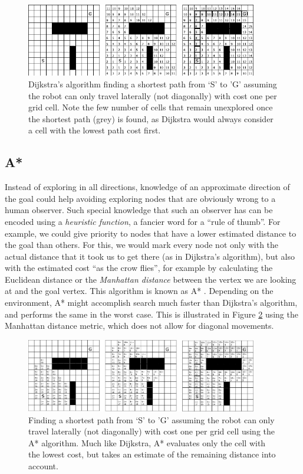 \begin{figure}[htb]
\centering
\includegraphics[width=0.9\textwidth]{figs/dijkstragrid}
\caption{Dijkstra's algorithm finding a shortest path from `S' to 'G' assuming the robot can only travel laterally (not diagonally) with cost one per grid cell. Note the few number of cells that remain unexplored once the shortest path (grey) is found, as Dijkstra would always consider a cell with the lowest path cost first.\label{fig:dijkstragrid}}
\end{figure}

\subsection{A*}\label{sec:astar}
Instead of exploring in all directions, knowledge of an approximate direction of the goal could help avoiding exploring nodes that are obviously wrong to a human observer. Such special knowledge that such an observer has can be encoded using a \emph{heuristic function}, a fancier word for a ``rule of thumb''. For example, we could give priority to nodes that have a lower estimated distance to the goal than others. For this, we would mark every node not only with the actual distance that it took us to get there (as in Dijkstra's algorithm), but also with the estimated cost ``as the crow flies'', for example by calculating the Euclidean distance or the \emph{Manhattan distance} between the vertex we are looking at and the goal vertex. This algorithm is known as A* \cite{hart1968formal}. Depending on the environment, A* might accomplish search much faster than Dijkstra's algorithm, and performs the same in the worst case. This is illustrated in Figure \ref{fig:astargrid} using the Manhattan distance metric, which does not allow for diagonal movements.

\begin{figure}[htb]
\centering
\includegraphics[width=0.9\textwidth]{figs/astargrid}
\caption{Finding a shortest path from `S' to 'G' assuming the robot can only travel laterally (not diagonally) with cost one per grid cell using the A* algorithm. Much like Dijkstra, A* evaluates only the cell with the lowest cost, but takes an estimate of the remaining distance into account.\label{fig:astargrid}}
\end{figure}

